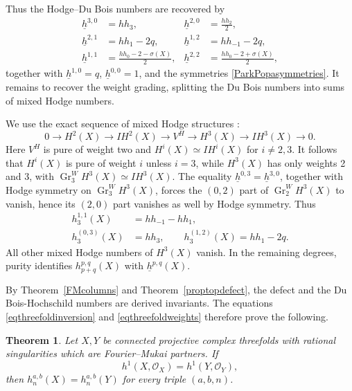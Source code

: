 \documentclass{amsart}
\theoremstyle{plain}
\newtheorem{theorem}[prop]{Theorem}
\theoremstyle{definition}
\DeclareMathOperator{\Gr}{Gr}
\begin{document}
Thus the Hodge--Du Bois numbers are recovered by
\begin{equation}\label{eqthreefoldinversion}
\begin{aligned}
\underline h^{3,0}&=hh_3,&
\underline h^{2,0}&=\frac{hh_2}{2},\\
\underline h^{2,1}&=hh_1-2q,&
\underline h^{1,2}&=hh_{-1}-2q,\\
\underline h^{1,1}&=\frac{hh_0-2-\sigma(X)}{2},&
\underline h^{2,2}&=\frac{hh_0-2+\sigma(X)}{2},
\end{aligned}
\end{equation}
together with $\underline h^{1,0}=q$, $\underline h^{0,0}=1$, and the symmetries \eqref{ParkPopasymmetries}. It remains to recover the weight grading, splitting the Du Bois numbers into sums of mixed Hodge numbers.

We use the exact sequence of mixed Hodge structures \cite[(7.2)]{PP25b}:
\[
0\longrightarrow H^2(X)\longrightarrow IH^2(X)
\longrightarrow V^H\longrightarrow H^3(X)
\longrightarrow IH^3(X)\longrightarrow0.
\]
Here $V^H$ is pure of weight two and $H^i(X)\simeq IH^i(X)$ for $i\ne2,3$.
It follows that $H^i(X)$ is pure of weight $i$ unless $i=3$, while
$H^3(X)$ has only weights 2 and 3, with
$\Gr_3^WH^3(X)\simeq IH^3(X)$.
The equality $\underline h^{0,3}=\underline h^{3,0}$, together with Hodge symmetry on $\Gr_3^WH^3(X)$, forces the $(0,2)$ part of
$\Gr_2^WH^3(X)$ to vanish, hence its $(2,0)$ part vanishes as well by Hodge symmetry. Thus
\begin{equation}\label{eqthreefoldweights}
\begin{aligned}
h_3^{1,1}(X)&=hh_{-1}-hh_1,\\
h_3^{(0,3)}(X)&=hh_3,\qquad
h_3^{(1,2)}(X)=hh_1-2q.
\end{aligned}
\end{equation}
All other mixed Hodge numbers of $H^3(X)$ vanish. In the remaining degrees, purity identifies $h_{p+q}^{p,q}(X)$ with
$\underline h^{p,q}(X)$.

By Theorem~\ref{FMcolumns} and Theorem~\ref{proptopdefect}, the defect and the Du Bois-Hochschild numbers are derived invariants. The equations \eqref{eqthreefoldinversion} and \eqref{eqthreefoldweights} therefore prove the following.

\begin{theorem}\label{thmthreefoldreconstruction}
Let $X,Y$ be connected projective complex threefolds with rational singularities which are Fourier--Mukai partners. If
\[
h^1(X,\mathcal O_X)=h^1(Y,\mathcal O_Y),
\]
then $h_n^{a,b}(X)=h_n^{a,b}(Y)$ for every triple $(a,b,n)$.
\end{theorem}
\end{document}
